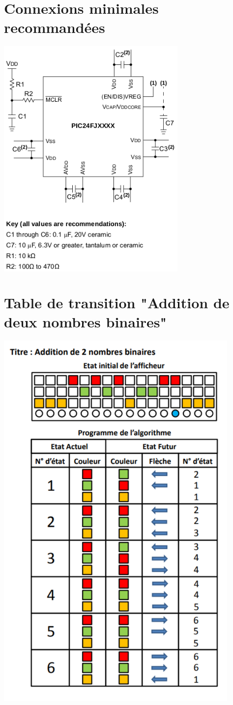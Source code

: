 \documentclass[12pt]{report}
\begin{document}
	\section{Connexions minimales recommandées}
	\label{sec:an4.1}
	\includegraphics[width=0.7\textwidth]{img/an1}
	\section{Table de transition "Addition de deux nombres binaires"}
	\label{sec:an4.2}
	\includegraphics[width=0.9\textwidth]{img/addition_binaire}
	
	
	
\end{document}
